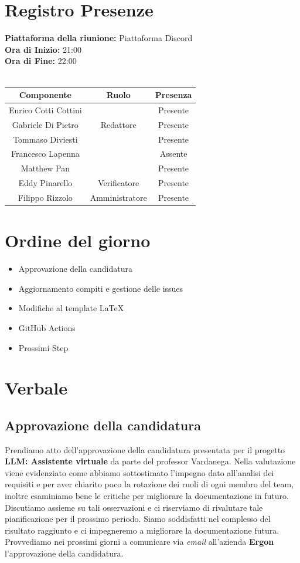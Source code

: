 \documentclass{article}
\begin{document}
\section{Registro Presenze}
\textbf{Piattaforma della riunione:} Piattaforma Discord \\
\textbf{Ora di Inizio:} 21:00\\
\textbf{Ora di Fine:} 22:00\\
\\
\begin{tabular}{|c|c|c|} %
    \hline
    \textbf{Componente} & \textbf{Ruolo} & \textbf{Presenza}\\
    \hline
    Enrico Cotti Cottini &  & Presente \\ 
    \hline
    Gabriele Di Pietro & Redattore & Presente\\ 
    \hline
    Tommaso Diviesti &  & Presente \\ 
    \hline 
    Francesco Lapenna & & Assente \\ 
    \hline
    Matthew Pan &  & Presente\\ 
    \hline 
    Eddy Pinarello & Verificatore & Presente \\ 
    \hline 
    Filippo Rizzolo & Amministratore & Presente \\ 
    \hline 
\end{tabular}
\vspace{3cm}
\section{Ordine del giorno}
\begin{itemize}
    \item Approvazione della candidatura
    \item Aggiornamento compiti e gestione delle issues
    \item Modifiche al template LaTeX
    \item GitHub Actions
    \item Prossimi Step
\end{itemize}
\newpage
\section{Verbale}
\subsection{Approvazione della candidatura}
Prendiamo atto dell'approvazione della candidatura presentata per il progetto \textbf{LLM: Assistente virtuale} da parte del professor Vardanega.
Nella valutazione viene evidenziato come abbiamo sottostimato l'impegno dato all'analisi dei requisiti e per aver chiarito poco la rotazione dei ruoli di ogni membro del team, inoltre esaminiamo bene le critiche per migliorare la documentazione in futuro.
Discutiamo assieme su tali osservazioni e ci riserviamo di rivalutare tale pianificazione per il prossimo periodo.
Siamo soddisfatti nel complesso del risultato raggiunto e ci impegneremo a migliorare la documentazione futura.
Provvediamo nei prossimi giorni a comunicare via \textit{email} all'azienda \textbf{Ergon} l'approvazione della candidatura.
\end{document}
